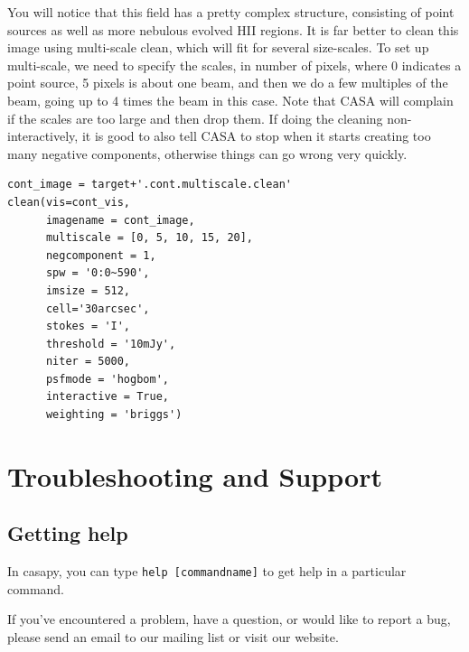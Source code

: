 \documentclass[force,almostfull,justified]{tufte-book}
\begin{document}
You will notice that this field has a pretty complex structure, consisting of point sources as well as
more nebulous evolved HII regions. It is far better to clean this image using multi-scale clean, which
will fit for several size-scales. To set up multi-scale, we need to specify the scales, in number of
pixels, where 0 indicates a point source, 5 pixels is about one beam, and then we do a few multiples
of the beam, going up to 4 times the beam in this case.   Note that CASA will complain if the scales
are too large and then drop them.   If doing the cleaning non-interactively, it is good to also tell
CASA to stop when it starts creating too many negative components, otherwise things can go wrong very
quickly.


\begin{casacmd}
\begin{verbatim}
cont_image = target+'.cont.multiscale.clean'
clean(vis=cont_vis,
      imagename = cont_image,
      multiscale = [0, 5, 10, 15, 20],
      negcomponent = 1,
      spw = '0:0~590',
      imsize = 512,
      cell='30arcsec',
      stokes = 'I',
      threshold = '10mJy',
      niter = 5000,
      psfmode = 'hogbom',
      interactive = True,
      weighting = 'briggs')
\end{verbatim}
\end{casacmd}


\chapter{Troubleshooting and Support}
\label{ch:troubleshooting}

\section{Getting help}
\label{sec:getting-help}

In casapy, you can type {\tt help [commandname]} to get help in a particular command.

If you've encountered a problem, have a question, or would like to report a bug, please send an email
to our mailing list or visit our website.

\backmatter

\newcommand{\aaps}{Astron. Astrophys. Suppl. Ser.}




\printindex
\end{document}

